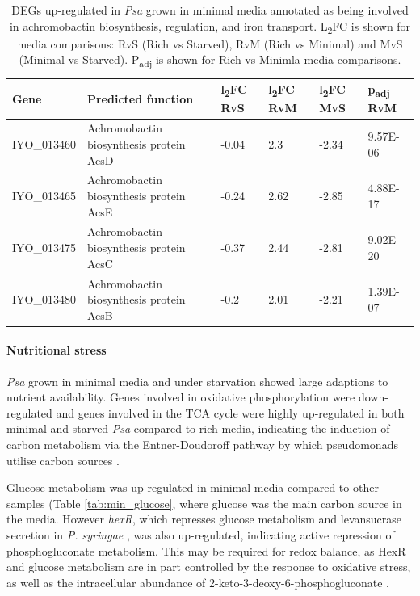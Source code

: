 \begin{table}[H]
\footnotesize
    \centering
    \begin{tabular}{p{1.8cm}p{6.5cm}p{0.8cm}p{0.8cm}p{0.8cm}p{1.5cm}}\toprule
Gene & Predicted function & l\textsubscript{2}FC RvS  & l\textsubscript{2}FC RvM & l\textsubscript{2}FC MvS & p\textsubscript{adj} RvM\\\midrule
IYO_013460 &Achromobactin biosynthesis protein AcsD & -0.04 & 2.3 & -2.34 &	9.57E-06\\
IYO_013465	& Achromobactin biosynthesis protein AcsE & -0.24 & 2.62 & -2.85 &	4.88E-17\\
IYO_013475 &Achromobactin biosynthesis protein AcsC & -0.37 & 2.44 & -2.81 & 9.02E-20\\
IYO_013480	& Achromobactin biosynthesis protein AcsB& -0.2 &2.01 &	-2.21 &1.39E-07\\
\bottomrule
    \end{tabular}
    \caption[Achromobactin genes up-regulated in \textit{Psa} in minimal media]{DEGs up-regulated in \textit{Psa} grown in minimal media annotated as being involved in achromobactin biosynthesis, regulation, and iron transport. L\textsubscript{2}FC is shown for media comparisons: RvS (Rich vs Starved), RvM (Rich vs Minimal) and MvS (Minimal vs Starved). P\textsubscript{adj} is shown for Rich vs Minimla media comparisons.}
    \label{tab:min_iron_3}
\end{table}


\paragraph{Nutritional stress}
\textit{Psa} grown in minimal media and under starvation showed large adaptions to nutrient availability. Genes involved in oxidative phosphorylation were down-regulated and genes involved in the TCA cycle were highly up-regulated in both minimal and starved \textit{Psa} compared to rich media, indicating the induction of carbon metabolism via the Entner-Doudoroff pathway by which pseudomonads utilise carbon sources \citep{Lessie-1984}. 

Glucose metabolism was up-regulated in minimal media compared to other samples (Table \ref{tab:min_glucose}, where glucose was the main carbon source in the media. However \textit{hexR}, which represses glucose metabolism and levansucrase secretion in \textit{P. syringae} \citep{Mehmood_Abdallah_Khandekar_Zhurina_Srivastava_Al-Karablieh_Alfaro-Espinoza_Pletzer_Ullrich_2015}, was also up-regulated, indicating active repression of phosphogluconate metabolism. This may be required for redox balance, as HexR and glucose metabolism are in part controlled by the response to oxidative stress, as well as the intracellular abundance of 2-keto-3-deoxy-6-phosphogluconate \citep{Daddaoua_Krell_Ramos_2009}.

